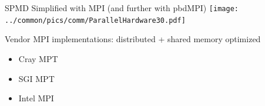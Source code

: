 \begin{frame}{SPMD Simplified with MPI (and further with pbdMPI)}
  \texttt{[image: ../common/pics/comm/ParallelHardware30.pdf]}
  \vspace{-1ex}
  \begin{block}{Vendor MPI implementations: distributed + shared
      memory optimized}
    \begin{minipage}{4cm}
      \begin{itemize}
      \item \small Cray MPT
      \item \small SGI MPT
      \end{itemize}
    \end{minipage}
    \begin{minipage}{4cm}
      \begin{itemize}
      \item \small Intel MPI
      \end{itemize}
    \end{minipage}
  \end{block}
\end{frame}

